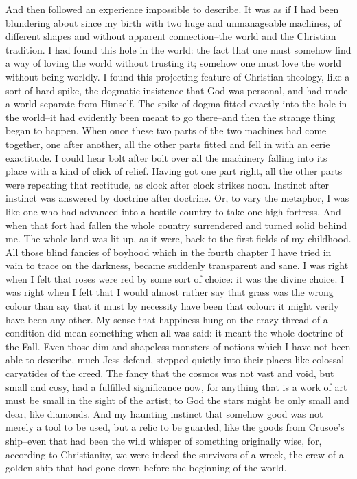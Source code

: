 \documentclass{book}
\begin{document}
And then followed an experience impossible to describe. It was as if I had been blundering about since my birth with two huge and unmanageable machines, of different shapes and without apparent connection–the world and the Christian tradition. I had found this hole in the world: the fact that one must somehow find a way of loving the world without trusting it; somehow one must love the world without being worldly. I found this projecting feature of Christian theology, like a sort of hard spike, the dogmatic insistence that God was personal, and had made a world separate from Himself. The spike of dogma fitted exactly into the hole in the world–it had evidently been meant to go there–and then the strange thing began to happen. When once these two parts of the two machines had come together, one after another, all the other parts fitted and fell in with an eerie exactitude. I could hear bolt after bolt over all the machinery falling into its place with a kind of click of relief. Having got one part right, all the other parts were repeating that rectitude, as clock after clock strikes noon. Instinct after instinct was answered by doctrine after doctrine. Or, to vary the metaphor, I was like one who had advanced into a hostile country to take one high fortress. And when that fort had fallen the whole country surrendered and turned solid behind me. The whole land was lit up, as it were, back to the first fields of my childhood. All those blind fancies of boyhood which in the fourth chapter I have tried in vain to trace on the darkness, became suddenly transparent and sane. I was right when I felt that roses were red by some sort of choice: it was the divine choice. I was right when I felt that I would almost rather say that grass was the wrong colour than say that it must by necessity have been that colour: it might verily have been any other. My sense that happiness hung on the crazy thread of a condition did mean something when all was said: it meant the whole doctrine of the Fall. Even those dim and shapeless monsters of notions which I have not been able to describe, much Jess defend, stepped quietly into their places like colossal caryatides of the creed. The fancy that the cosmos was not vast and void, but small and cosy, had a fulfilled significance now, for anything that is a work of art must be small in the sight of the artist; to God the stars might be only small and dear, like diamonds. And my haunting instinct that somehow good was not merely a tool to be used, but a relic to be guarded, like the goods from Crusoe’s ship–even that had been the wild whisper of something originally wise, for, according to Christianity, we were indeed the survivors of a wreck, the crew of a golden ship that had gone down before the beginning of the world.
\end{document}
